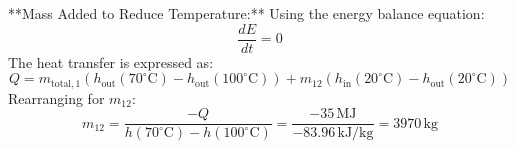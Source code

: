 **Mass Added to Reduce Temperature:**  
Using the energy balance equation:  
\[
\frac{dE}{dt} = 0
\]  
The heat transfer is expressed as:  
\[
Q = m_{\text{total},1} \left( h_{\text{out}}(70^\circ\text{C}) - h_{\text{out}}(100^\circ\text{C}) \right) + m_{12} \left( h_{\text{in}}(20^\circ\text{C}) - h_{\text{out}}(20^\circ\text{C}) \right)
\]  
Rearranging for \( m_{12} \):  
\[
m_{12} = \frac{-Q}{h(70^\circ\text{C}) - h(100^\circ\text{C})} = \frac{-35 \, \text{MJ}}{-83.96 \, \text{kJ/kg}} = 3970 \, \text{kg}
\]